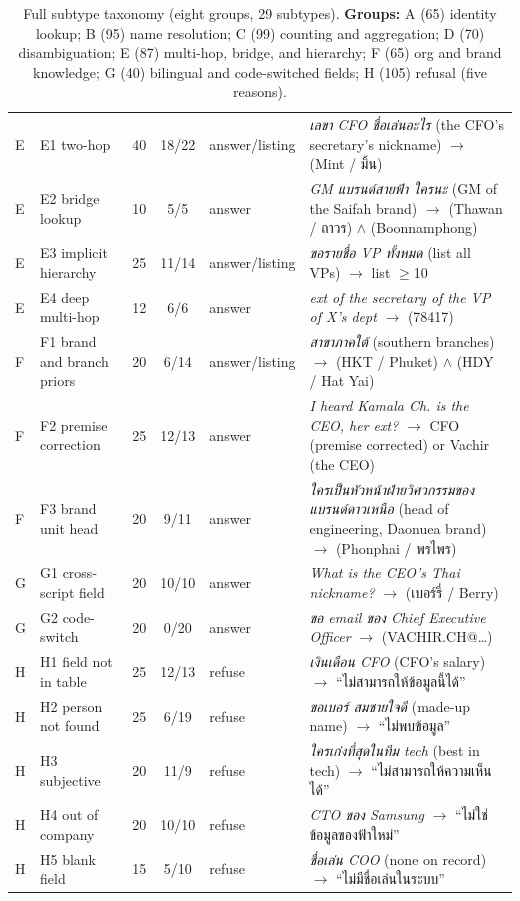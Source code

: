 \documentclass[11pt]{article}
\begin{document}
\begin{table}[t]
\begin{tabular}{@{}llrcl>{\raggedright\arraybackslash}p{5.4cm}@{}}
E & E1 two-hop & 40 & 18/22 & answer/listing & \emph{เลขา CFO ชื่อเล่นอะไร} (the CFO's secretary's nickname) $\to$ (Mint / มิ้น) \\
E & E2 bridge lookup & 10 & 5/5 & answer & \emph{GM แบรนด์สายฟ้า ใครนะ} (GM of the Saifah brand) $\to$ (Thawan / ถาวร) $\wedge$ (Boonnamphong) \\
E & E3 implicit hierarchy & 25 & 11/14 & answer/listing & \emph{ขอรายชื่อ VP ทั้งหมด} (list all VPs) $\to$ list $\ge$10 \\
E & E4 deep multi-hop & 12 & 6/6 & answer & \emph{ext of the secretary of the VP of X's dept} $\to$ (78417) \\
F & F1 brand and branch priors & 20 & 6/14 & answer/listing & \emph{สาขาภาคใต้} (southern branches) $\to$ (HKT / Phuket) $\wedge$ (HDY / Hat Yai) \\
F & F2 premise correction & 25 & 12/13 & answer & \emph{I heard Kamala Ch. is the CEO, her ext?} $\to$ CFO (premise corrected) or Vachir (the CEO) \\
F & F3 brand unit head & 20 & 9/11 & answer & \emph{ใครเป็นหัวหน้าฝ่ายวิศวกรรมของแบรนด์ดาวเหนือ} (head of engineering, Daonuea brand) $\to$ (Phonphai / พรไพร) \\
G & G1 cross-script field & 20 & 10/10 & answer & \emph{What is the CEO's Thai nickname?} $\to$ (เบอร์รี่ / Berry) \\
G & G2 code-switch & 20 & 0/20 & answer & \emph{ขอ email ของ Chief Executive Officer} $\to$ (VACHIR.CH@{\ldots}) \\
H & H1 field not in table & 25 & 12/13 & refuse & \emph{เงินเดือน CFO} (CFO's salary) $\to$ ``ไม่สามารถให้ข้อมูลนี้ได้'' \\
H & H2 person not found & 25 & 6/19 & refuse & \emph{ขอเบอร์ สมชายใจดี} (made-up name) $\to$ ``ไม่พบข้อมูล'' \\
H & H3 subjective & 20 & 11/9 & refuse & \emph{ใครเก่งที่สุดในทีม tech} (best in tech) $\to$ ``ไม่สามารถให้ความเห็นได้'' \\
H & H4 out of company & 20 & 10/10 & refuse & \emph{CTO ของ Samsung} $\to$ ``ไม่ใช่ข้อมูลของฟ้าใหม่'' \\
H & H5 blank field & 15 & 5/10 & refuse & \emph{ชื่อเล่น COO} (none on record) $\to$ ``ไม่มีชื่อเล่นในระบบ'' \\
\bottomrule
\end{tabular}
\caption{Full subtype taxonomy (eight groups, 29 subtypes). \textbf{Groups:} A (65) identity lookup; B (95)
name resolution; C (99) counting and aggregation; D (70) disambiguation; E (87) multi-hop, bridge, and
hierarchy; F (65) org and brand knowledge; G (40) bilingual and code-switched fields; H (105) refusal
(five reasons).}
\label{tab:taxonomy}
\end{table}
\end{document}
